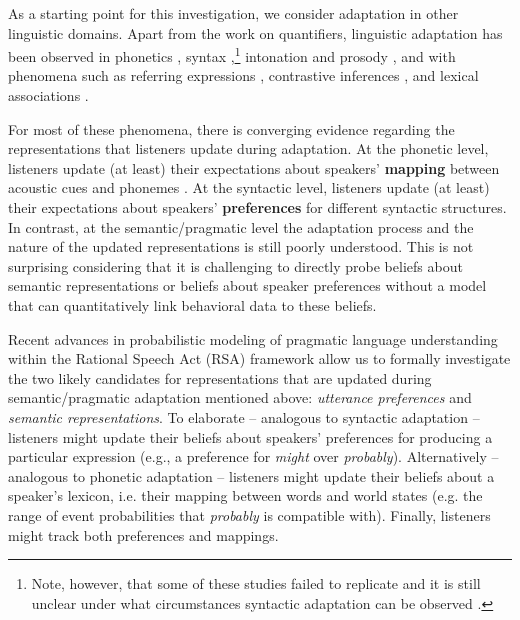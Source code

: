 \documentclass[man, floatsintext]{apa6}
\begin{document}
As a starting point for this investigation, we consider adaptation in other linguistic domains. Apart from the work on quantifiers, linguistic adaptation has been observed in  phonetics \parencite{Goldinger1998,Norris2003,Kraljic2005,Kraljic2007,Babel2012,Kleinschmidt2015,Clayards2008}, 
syntax \parencite{Kamide2012,Fine2013,Fine2016,Myslin2016,Kroczek2017},\footnote{Note, 
however, that some of these studies failed to replicate and it is still unclear under what 
circumstances syntactic adaptation can be observed \parencite[see][]{Liu2017,HarringtonStack2018}.} intonation and prosody \parencite{Kurumada2012,Roettger2019}, and with phenomena such as referring expressions
\parencite{Clark1986,Brennan1996,Metzing2003,Horton2005,Brennan2009,Hawkins2017}, contrastive inferences \parencite{Grodner2011,Pogue2016}, and lexical associations \parencite{DelaneyBusch2019}. 

For most of these phenomena, there is converging evidence regarding the representations that listeners update during adaptation. At the phonetic level, 
listeners update (at least) their expectations about speakers' \textbf{mapping} between acoustic cues and phonemes \parencite[e.g.,][]{Kleinschmidt2015}.
At the syntactic level, listeners update (at least) their expectations about speakers' \textbf{preferences} 
for different syntactic structures. In contrast, at the semantic/pragmatic level the adaptation process and the 
nature of the updated representations is still poorly understood. This is not surprising considering that it is challenging
to directly probe beliefs about semantic representations or beliefs about speaker preferences without 
a model that can quantitatively link behavioral data to these beliefs. 

Recent advances in probabilistic modeling of pragmatic language understanding within the Rational Speech Act (RSA) framework \parencite{Frank2012,Goodman2016,Franke2016} allow us to formally investigate the two likely candidates for representations that are updated during semantic/pragmatic adaptation mentioned above: \emph{utterance preferences} and \emph{semantic representations}. To elaborate -- analogous to syntactic adaptation -- 
listeners might update their beliefs about speakers' preferences
for producing a particular expression (e.g., a preference for \emph{might} over \emph{probably}). Alternatively -- analogous to phonetic adaptation -- listeners might update their beliefs about a speaker's lexicon, i.e. their mapping between 
words and world states (e.g. the range of event probabilities that \emph{probably} is compatible with). Finally, listeners might track both preferences and mappings.
\end{document}
